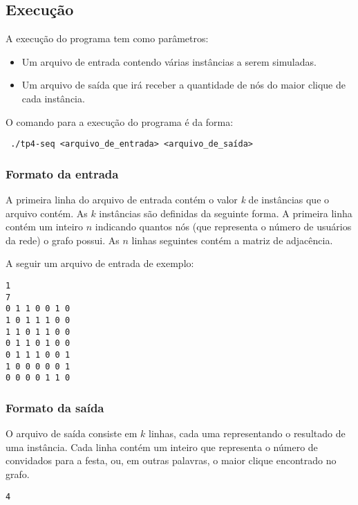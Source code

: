 \documentclass[12pt]{article}
\begin{document}
\subsection{Execução}

A execução do programa tem como parâmetros:
\begin{itemize}
\item Um arquivo de entrada contendo várias instâncias a serem simuladas.
\item Um arquivo de saída que irá receber a quantidade de nós do maior clique de cada instância.
\end{itemize}

O comando para a execução do programa é da forma:

\begin{footnotesize}
\begin{verbatim} ./tp4-seq <arquivo_de_entrada> <arquivo_de_saída>\end{verbatim}
\end{footnotesize}


\subsubsection{Formato da entrada}
\label{entrada}

A primeira linha do arquivo de entrada contém o valor \textit{k} de instâncias que o arquivo contém. As $k$ instâncias são definidas da seguinte forma. A primeira linha contém um inteiro $n$ indicando quantos nós (que representa o número de usuários da rede) o grafo possui. As $n$ linhas seguintes contém a matriz de adjacência.

A seguir um arquivo de entrada de exemplo:

\begin{verbatim}
1
7
0 1 1 0 0 1 0
1 0 1 1 1 0 0
1 1 0 1 1 0 0
0 1 1 0 1 0 0
0 1 1 1 0 0 1
1 0 0 0 0 0 1
0 0 0 0 1 1 0
\end{verbatim}

\subsubsection{Formato da saída}
\label{saida}

O arquivo de saída consiste em $k$ linhas, cada uma representando o resultado de uma instância. Cada linha contém um inteiro que representa o número de convidados para a festa, ou, em outras palavras, o maior clique encontrado no grafo.

\begin{verbatim}
4
\end{verbatim}
\end{document}
